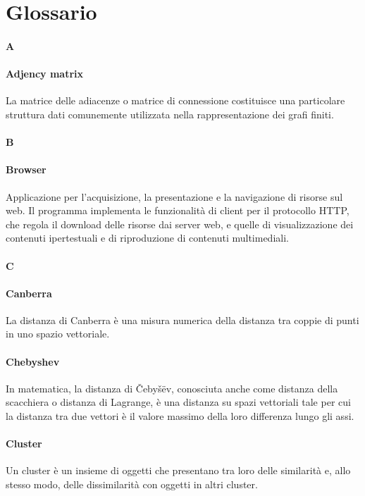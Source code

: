 \appendix
\section{Glossario}
\paragraph*{A}

\paragraph*{Adjency matrix}
La matrice delle adiacenze o matrice di connessione costituisce una particolare struttura dati comunemente utilizzata nella rappresentazione dei grafi finiti.

\paragraph*{B}

\paragraph*{Browser}
Applicazione per l'acquisizione, la presentazione e la navigazione di risorse sul web.
Il programma implementa le funzionalità di client per il protocollo HTTP, che regola il download delle risorse dai server web, e quelle di visualizzazione dei contenuti ipertestuali e di riproduzione di contenuti multimediali.

\paragraph*{C}

\paragraph*{Canberra}
La distanza di Canberra è una misura numerica della distanza tra coppie di punti in uno spazio vettoriale.

\paragraph*{Chebyshev}
In matematica, la distanza di Čebyšëv, conosciuta anche come distanza della scacchiera o distanza di Lagrange, è una distanza su spazi vettoriali tale per cui la distanza tra due vettori è il valore massimo della loro differenza lungo gli assi.

\paragraph*{Cluster}
Un cluster è un insieme di oggetti che presentano tra loro delle similarità e, allo stesso modo, delle dissimilarità con oggetti in altri cluster.
	
